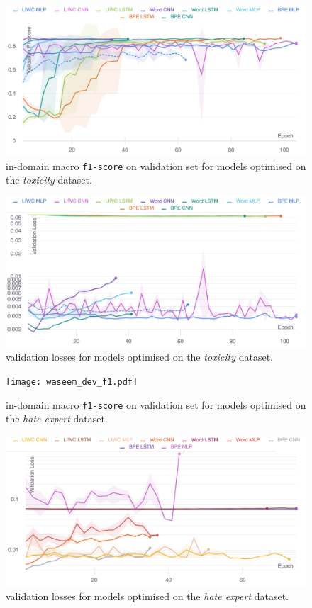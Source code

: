 \begin{figure}
    \centering
    \includegraphics[width=\textwidth]{wulczyn_dev_f1.pdf}
    \caption{in-domain macro \texttt{f1-score} on validation set for models optimised on the \textit{toxicity} dataset.}
    \label{fig:wulczyn_dev_f1}
\end{figure}
\begin{figure}
    \centering
    \includegraphics[width=\textwidth]{wulczyn_dev_loss_stderr_logscale.pdf}
    \caption{validation losses for models optimised on the \textit{toxicity} dataset.}
    \label{fig:wulczyn_dev_loss}
\end{figure}

\begin{figure}
    \centering
    \texttt{[image: waseem\_dev\_f1.pdf]}
    \caption{in-domain macro \texttt{f1-score} on validation set for models optimised on the \textit{hate expert} dataset.}
    \label{fig:waseem_dev_f1}
\end{figure}
\begin{figure}
    \centering
    \includegraphics[width=\textwidth]{waseem_dev_loss_stderr_logscale.pdf}
    \caption{validation losses for models optimised on the \textit{hate expert} dataset.}
    \label{fig:waseem_dev_loss}
\end{figure}

